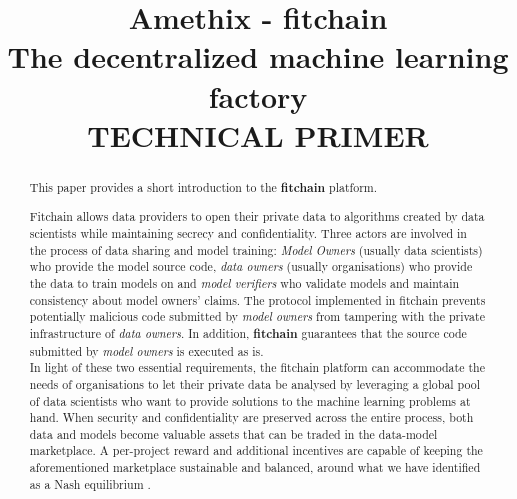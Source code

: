 \documentclass[12pt, a4paper,titlepage]{extreport}
\date{}
\begin{document}
 
\title{\textbf{Amethix - fitchain}\\ The decentralized machine learning factory\\
\small{TECHNICAL PRIMER}}

\maketitle

\begin{abstract}
This paper provides a short introduction to the \textbf{fitchain} platform. 

Fitchain allows data providers to open their private data to algorithms created by data scientists while maintaining secrecy and confidentiality. Three actors are involved in the process of data sharing and model training: \textit{Model Owners} (usually data scientists) who provide the model source code, \textit{data owners} (usually organisations) who provide the data to train models on and \textit{model verifiers} who validate models and maintain consistency about model owners' claims. 
The protocol implemented in fitchain prevents potentially malicious code submitted by \textit{model owners} from tampering with the private infrastructure of \textit{data owners}. In addition, \textbf{fitchain} guarantees that the source code submitted by \textit{model owners} is executed as is. \\
In light of these two essential requirements, the fitchain platform can accommodate the needs of organisations to let their private data be analysed by leveraging a global pool of data scientists who want to provide solutions to the machine learning problems at hand. When security and confidentiality are preserved across the entire process, both data and models become valuable assets that can be traded in the data-model marketplace. A per-project reward and additional incentives are capable of keeping the aforementioned marketplace sustainable and balanced, around what we have identified as a Nash equilibrium \cite{nash}.
\end{abstract}
\end{document}
